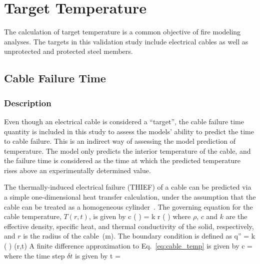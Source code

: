 
\chapter{Target Temperature}
\label{Target_Temperature_Chapter}

The calculation of target temperature is a common objective of fire modeling analyses. The targets in this validation study include electrical cables as well as unprotected and protected steel members.

\section{Cable Failure Time}

\subsection*{Description}

Even though an electrical cable is considered a ``target'', the cable failure time quantity is included in this study to assess the models' ability to predict the time to cable failure. This is an indirect way of assessing the model prediction of temperature. The model only predicts the interior temperature of the cable, and the failure time is considered as the time at which the predicted temperature rises above an experimentally determined value.

The thermally-induced electrical failure (THIEF) of a cable can be predicted via a simple one-dimensional heat transfer calculation, under the assumption that the cable can be treated as a homogeneous cylinder~\cite{CAROLFIRE}. The governing equation for the cable temperature,
$T(r,t)$, is given by
\be
\rho c \left(  \right) =   k r \left(  \right)
\label{eq:cable_temp}
\ee
where $\rho$, $c$ and $k$ are the effective density, specific heat, and thermal conductivity of the solid, respectively, and $r$ is the radius of the cable~(\si{m}).
The boundary condition is defined as
\be
\dot q'' = k \left(  \right) (r,t)
\ee
A finite difference approximation to Eq.~\ref{eq:cable_temp} is given by
\be
\rho c  =   
\ee
where the time step $\delta t$ is given by
\be
\delta t = 
\ee


